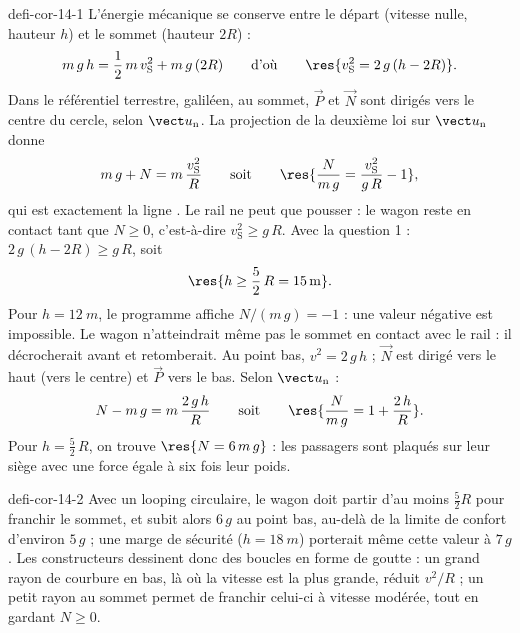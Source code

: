 \begin{blocEdition}{defi-cor-14-1}
L'énergie mécanique se conserve entre le départ (vitesse nulle, hauteur $h$) et le sommet (hauteur $2R$) :
\[m\,g\,h=\frac12\,m\,v_\mathrm{S}^2+m\,g\,(2R)\qquad\text{d'où}\qquad\res{v_\mathrm{S}^2=2\,g\,(h-2R)}.\]
Dans le référentiel terrestre, galiléen, au sommet, $\vec{P}$ et $\vec{N}$ sont dirigés vers le centre du cercle, selon
$\un$. La projection de la deuxième loi sur $\un$ donne
\[m\,g+N=m\,\frac{v_\mathrm{S}^2}{R}\qquad\text{soit}\qquad\res{\frac{N}{m\,g}=\frac{v_\mathrm{S}^2}{g\,R}-1},\]
qui est exactement la ligne .
Le rail ne peut que pousser : le wagon reste en contact tant que $N\geq0$, c'est-à-dire $v_\mathrm{S}^2\geq g\,R$. Avec
la question 1 : $2\,g\,(h-2R)\geq g\,R$, soit
\[\res{h\geq\frac52\,R=\qty{15}{m}}.\]
Pour $h=\qty{12}{m}$, le programme affiche $N/(m\,g)=-1$ : une valeur négative est impossible. Le wagon n'atteindrait
même pas le sommet en contact avec le rail : il décrocherait avant et retomberait.
Au point bas, $v^2=2\,g\,h$ ; $\vec{N}$ est dirigé vers le haut (vers le centre) et $\vec{P}$ vers le bas. Selon $\un$ :
\[N-m\,g=m\,\frac{2\,g\,h}{R}\qquad\text{soit}\qquad\res{\frac{N}{m\,g}=1+\frac{2\,h}{R}}.\]
Pour $h=\frac52\,R$, on trouve $\res{N=6\,m\,g}$ : les passagers sont plaqués sur leur siège avec une force égale à six
fois leur poids.
\end{blocEdition}

\begin{blocEdition}{defi-cor-14-2}
\label{figedition-defi-cor-14-2-1}
Avec un looping circulaire, le wagon doit partir d'au moins $\frac52R$ pour franchir le sommet, et subit alors $6\,g$
au point bas, au-delà de la limite de confort d'environ $5\,g$ ; une marge de sécurité ($h=\qty{18}{m}$) porterait même
cette valeur à $7\,g$. Les constructeurs dessinent donc des boucles en forme de goutte : un grand rayon de courbure en
bas, là où la vitesse est la plus grande, réduit $v^2/R$ ; un petit rayon au sommet permet de franchir celui-ci à
vitesse modérée, tout en gardant $N\geq0$.
\end{blocEdition}

